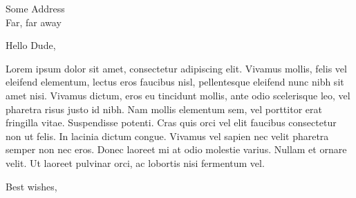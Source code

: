 \documentclass[12pt,english]{scrlttr2}
\date{} %
\begin{document}
\raggedright

\begin{letter}{Some Address \\ Far, far away}
\opening{Hello Dude,}

Lorem ipsum dolor sit amet, consectetur adipiscing elit. Vivamus mollis, felis vel eleifend elementum, lectus eros faucibus nisl, pellentesque eleifend nunc nibh sit amet nisi. Vivamus dictum, eros eu tincidunt mollis, ante odio scelerisque leo, vel pharetra risus justo id nibh. Nam mollis elementum sem, vel porttitor erat fringilla vitae. Suspendisse potenti. Cras quis orci vel elit faucibus consectetur non ut felis. In lacinia dictum congue. Vivamus vel sapien nec velit pharetra semper non nec eros. Donec laoreet mi at odio molestie varius. Nullam et ornare velit. Ut laoreet pulvinar orci, ac lobortis nisi fermentum vel.


\closing{Best wishes,}
\end{letter}
\end{document}
